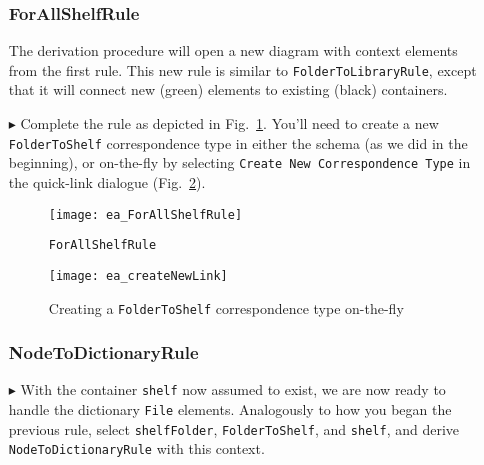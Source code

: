 \begin{itemize}
\newpage

\subsubsection{ForAllShelfRule} %

The derivation procedure will open a new diagram with context elements from the first rule. This new rule is similar to
\texttt{FolderToLibraryRule}, except that it will connect new (green) elements to existing (black) containers. 

\item[$\blacktriangleright$] Complete the rule as depicted in Fig.~\ref{ea:ForAllShelves_Complete}. You'll need to create a new \texttt{FolderToShelf}
correspondence type in either the schema (as we did in the beginning), or on-the-fly by selecting \texttt{Create New Correspondence Type} in the quick-link
dialogue (Fig.~\ref{ea:corrOnTheFly}).

\begin{figure}[htbp]
\begin{center}
  \texttt{[image: ea\_ForAllShelfRule]}
  \caption{\texttt{ForAllShelfRule}}
  \label{ea:ForAllShelves_Complete}
\end{center}
\end{figure}

\begin{figure}[htbp]
\begin{center}
  \texttt{[image: ea\_createNewLink]}
  \caption{Creating a \texttt{FolderToShelf} correspondence type on-the-fly}
  \label{ea:corrOnTheFly}
\end{center}
\end{figure}

\subsubsection{NodeToDictionaryRule} %

\item[$\blacktriangleright$] With the container \texttt{shelf} now assumed to exist, we are now ready to handle the dictionary \texttt{File} elements.
Analogously to how you began the previous rule, select \texttt{shelfFolder}, \texttt{FolderToShelf}, and \texttt{shelf}, and derive
\texttt{NodeToDictionaryRule} with this context.

\vspace{0.5cm}


\end{itemize}
